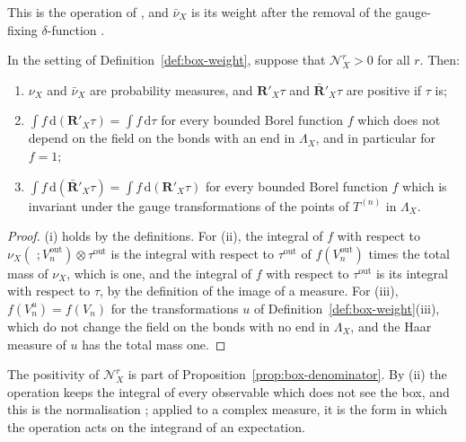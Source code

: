 \documentclass[11pt]{preprint}
\makeatletter
\newcommand{\dd}{\mathrm{d}}
\newcommand*{\bigcdot}{}%
\DeclareRobustCommand*{\bigcdot}{%
	\mathbin{\mathpalette\bigcdot@{}}%
}
\newcommand*{\bigcdot@scalefactor}{.7}
\newcommand*{\bigcdot@widthfactor}{1.15}
\newcommand*{\bigcdot@}[2]{%
	\sbox0{$#1\vcenter{}$}%
	\sbox2{$#1\cdot\m@th$}%
	\hbox to \bigcdot@widthfactor\wd2{%
		\hss
		\raise\ht0\hbox{%
			\scalebox{\bigcdot@scalefactor}{%
				\lower\ht0\hbox{$#1\bullet\m@th$}%
			}%
		}%
		\hss
	}%
}
\numberwithin{equation}{section}
\makeatother
\begin{document}
This is the operation of \cite[(1.100), (1.101)]{BalabanLFR1}, and $\bar\nu_X$ is its weight after the removal of the gauge-fixing $\delta$-function \cite[p.~378]{BalabanLFR2}.

\begin{lemma}\label{lem:r-normalisation}
In the setting of Definition~\ref{def:box-weight}, suppose that $\mathcal N^r_X > 0$ for all $r$. Then:
\begin{enumerate}[label=(\roman*)]
\item $\nu_X$ and $\bar\nu_X$ are probability measures, and $\mathbf R'_X\tau$ and $\bar{\mathbf R}'_X\tau$ are positive if $\tau$ is;
\item $\int f\,\dd(\mathbf R'_X\tau) = \int f\,\dd\tau$ for every bounded Borel function $f$ which does not depend on the field on the bonds with an end in $\Lambda_X$, and in particular for $f = 1$;
\item $\int f\,\dd(\bar{\mathbf R}'_X\tau) = \int f\,\dd(\mathbf R'_X\tau)$ for every bounded Borel function $f$ which is invariant under the gauge transformations of the points of $T^{(n)}$ in $\Lambda_X$.
\end{enumerate}
\end{lemma}

\begin{proof}
(i) holds by the definitions. For (ii), the integral of $f$ with respect to $\nu_X(\,\bigcdot\,; V^{\mathrm{out}}_n) \otimes \tau^{\mathrm{out}}$ is the integral with respect to $\tau^{\mathrm{out}}$ of $f(V^{\mathrm{out}}_n)$ times the total mass of $\nu_X$, which is one, and the integral of $f$ with respect to $\tau^{\mathrm{out}}$ is its integral with respect to $\tau$, by the definition of the image of a measure. For (iii), $f(V_n^u) = f(V_n)$ for the transformations $u$ of Definition~\ref{def:box-weight}(iii), which do not change the field on the bonds with no end in $\Lambda_X$, and the Haar measure of $u$ has the total mass one.
\end{proof}

The positivity of $\mathcal N^r_X$ is part of Proposition~\ref{prop:box-denominator}. By (ii) the operation keeps the integral of every observable which does not see the box, and this is the normalisation \cite[(1.102)]{BalabanLFR1}; applied to a complex measure, it is the form in which the operation acts on the integrand of an expectation.
\end{document}

